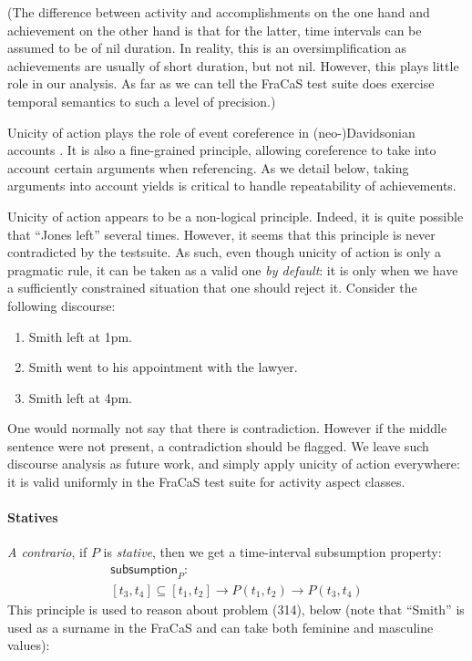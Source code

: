 \documentclass[11pt,a4paper]{article}
\newcommand\constant[1]{\mathsf{#1}}
\begin{document}
(The difference between activity and accomplishments on the one hand and
achievement on the other hand is that for the latter, time intervals
can be assumed to be of nil duration. In reality, this is an
oversimplification as achievements are usually of short duration, but
not nil. However, this plays little role in our
analysis. As far as we can tell the FraCaS test suite does exercise temporal semantics to
such a level of precision.)

Unicity of action plays the role of event coreference in
(neo-)Davidsonian accounts \citep{parsons1990events}. It is also a fine-grained
principle, allowing coreference to take into account certain arguments
when referencing. As we detail below, taking arguments into account
yields is critical to handle repeatability of achievements.

Unicity of action appears to be a non-logical principle. Indeed, it is
quite possible that ``Jones left'' several times. However, it seems
that this principle is never contradicted by the testsuite. As such,
even though unicity of action is only a pragmatic rule, it can be
taken as a valid one \emph{by default}: it is only when we have a
sufficiently constrained situation that one should reject it. Consider
the following discourse:
\begin{enumerate}[parsep=0pt,itemsep=1pt,label=(\arabic*)]
\item Smith left at 1pm.
\item Smith went to his appointment with the lawyer.
\item Smith left at 4pm.
\end{enumerate}
One would normally not say that there is contradiction. However if the
middle sentence were not present, a contradiction should be
flagged. We leave such discourse analysis as future work, and simply
apply unicity of action everywhere: it is valid uniformly in the
FraCaS test suite for activity aspect classes.


\paragraph{Statives}
\textit{A contrario}, if \(P\) is \emph{stative}, then we get a time-interval subsumption property:
\vspace{-1.5ex}
\begin{multline*}
\constant {subsumption}_P :\\ [t_3,t_4] ⊆ [t_1,t_2] → P (t_1,t_2) → P (t_3,t_4)
\end{multline*}
This principle is used to reason about problem (314), below (note that ``Smith'' is used as a surname in the FraCaS and can take both feminine and masculine values):
\end{document}
